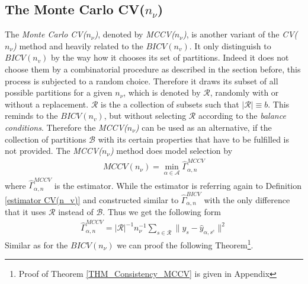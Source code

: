 \documentclass[Research_Module_ES.tex]{subfiles}
\begin{document}
\subsection{The Monte Carlo CV($n_\nu$)}

The \textit{Monte Carlo CV($n_\nu$)}, denoted by \textit{MCCV($n_\nu$)}, is another variant of the \textit{CV($n_\nu$)} method and heavily related to the $BICV(n_v)$. It only distinguish to $BICV(n_v)$ by the way how it chooses its set of partitions. Indeed it does not choose them by a combinatorial procedure as described in the section before, this process is subjected to a random choice. Therefore it draws its subset of all possible partitions for a given $n_\nu$, which is denoted by $\mathcal{R}$, randomly with or without a replacement. $\mathcal{R}$ is the a collection of subsets such that $|\mathcal{R}|\equiv b$. This reminds to the $BICV(n_v)$, but without selecting $\mathcal{R}$ according to the \textit{balance conditions}. Therefore the \textit{MCCV($n_\nu$)} can be used as an alternative, if the collection of partitions $\mathcal{B}$ with its certain properties that have to be fulfilled is not provided. The \textit{MCCV($n_\nu$)} method does model selection by 
\begin{align*}
MCCV(n_\nu)=\min_{\alpha\in\mathcal{A}}\hat{\Gamma}_{\alpha,n}^{MCCV}
\end{align*}
where $\hat{\Gamma}_{\alpha,n}^{MCCV}$ is the estimator. While the estimator is referring again to Definition \ref{estimator CV(n_v)} and constructed similar to $\hat{\Gamma}_{\alpha,n}^{BICV}$ with the only difference that it uses $\mathcal{R}$ instead of $\mathcal{B}$. Thus we get the following form
\begin{align*}
\hat{\Gamma}_{\alpha,n}^{MCCV}=|\mathcal{R}|^{-1}n_\nu^{-1}\sum_{s\in\mathcal{R}}\parallel y_s-\hat{y}_{\alpha,s^c}\parallel^2
\end{align*}
Similar as for the $BICV(n_\nu)$ we can proof the following Theorem\footnote{Proof of Theorem \ref{THM_Consistency_MCCV} is given in Appendix }. 
\end{document}
